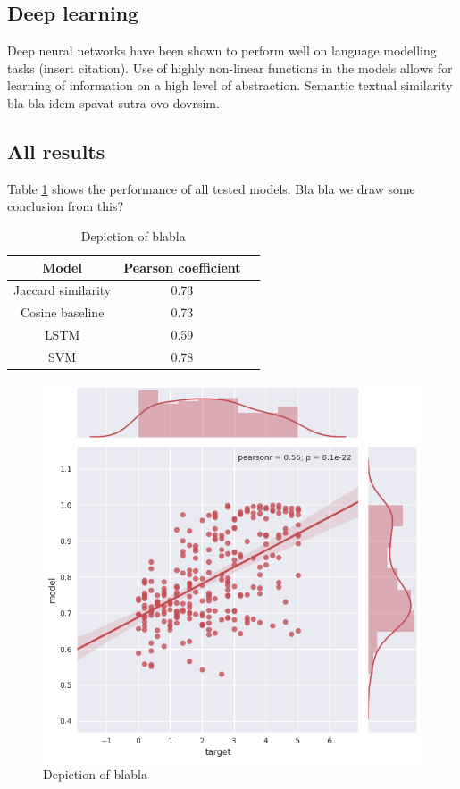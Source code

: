 \documentclass[10pt, a4paper]{article}
\begin{document}
\begin{table}[h!]
\subsection{Deep learning}

Deep neural networks have been shown to perform well on language modelling tasks
(insert citation). Use of highly non-linear functions in the models allows for learning of information on a high level of abstraction. Semantic textual similarity bla bla idem spavat sutra ovo dovrsim.

\subsection{All results}

Table \ref{tab:all_results} shows the performance of all tested models.
Bla bla we draw some conclusion from this?
\begin{table}
	\caption{Model comparison}
\label{tab:all_results}
\begin{center}
\begin{tabular}{ccc}
\toprule
Model & Pearson coefficient \\
\midrule
Jaccard similarity & 0.73 \\
Cosine baseline & 0.73 \\
LSTM & 0.59 \\
SVM & 0.78 \\
\bottomrule
\end{tabular}
\end{center}
\end{table}


\newpage
\begin{figure}
	\begin{center}
	\includegraphics[width=\columnwidth]{only_2nd_layer.png}
	\caption{Depiction of blabla}
	\label{fig:lstm_2nd_layer}
	\end{center}
\end{figure}




\end{table}
\end{document}
